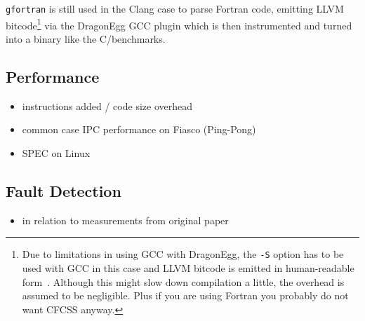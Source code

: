 \texttt{gfortran} is still used in the Clang case to parse Fortran code, emitting LLVM
bitcode\footnote{Due to limitations in using GCC with DragonEgg, the
\texttt{-S} option has to be used with GCC in this case and LLVM bitcode is
emitted in human-readable form~\cite[DragonEgg in action]{dragonegg}. Although
this might slow down compilation a little, the overhead is assumed to be
negligible. Plus if you are using Fortran you probably do not want CFCSS
anyway.} via the DragonEgg GCC plugin \cite{dragonegg} which is then
instrumented and turned into a binary like the C/\CPP benchmarks.

\subsection{Performance}

\begin{itemize}
  \item instructions added / code size overhead
  \item common case IPC performance on Fiasco (Ping-Pong)
  \item SPEC on Linux
\end{itemize}

\subsection{Fault Detection}

\begin{itemize}
  \item in relation to measurements from original paper
\end{itemize}

